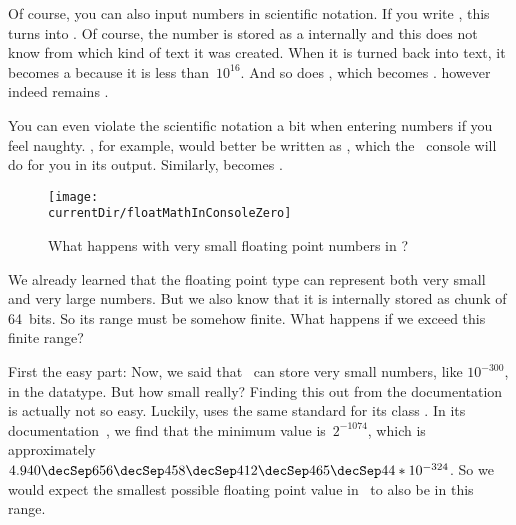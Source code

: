 Of course, you can also input numbers in scientific notation.
If you write , this turns into .
Of course, the number is stored as a  internally and this  does not know from which kind of text it was created.
When it is turned back into text, it becomes a  because it is less than~$10^{16}$.
And so does , which becomes .
 however indeed remains .

You can even violate the scientific notation a bit when entering numbers if you feel naughty.
, for example, would better be written as , which the \python\ console will do for you in its output.
Similarly,  becomes .
\endhsection%
%
%
\label{sec:float:special}%
%
\begin{figure}%
\centering%
\texttt{[image: \\currentDir/floatMathInConsoleZero]}%
\caption{What happens with very small floating point numbers in \python?}%
\label{fig:floatMathInConsoleZero}%
\end{figure}%
%
We already learned that the floating point type  can represent both very small and very large numbers.
But we also know that it is internally stored as chunk of 64~bits.
So its range must be somehow finite.
What happens if we exceed this finite range?

First the easy part:
Now, we said that \python\ can store very small numbers, like $10^{-300}$, in the  datatype.
But how small really?
Finding this out from the documentation is actually not so easy.
Luckily,  uses the same standard for its class .
In its documentation~\cite{O2024CD}, we find that the minimum value is~$2^{-1074}$, which is approximately~$4.940\decSep656\decSep458\decSep412\decSep465\decSep44*10^{-324}$.
So we would expect the smallest possible floating point value in \python\ to also be in this range.

